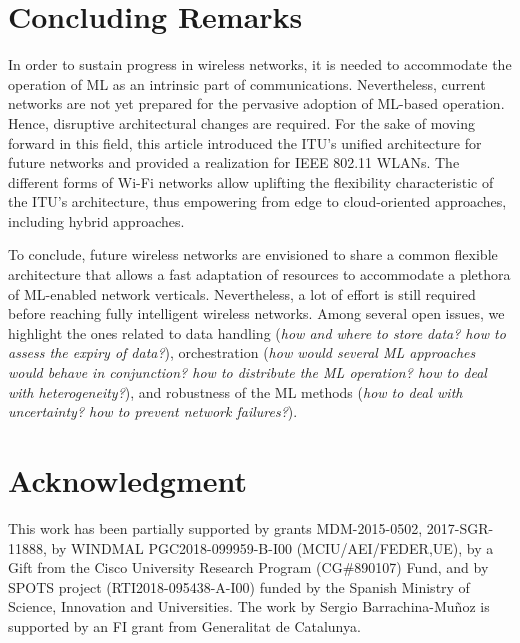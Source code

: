 \documentclass[journal]{IEEEtran}
\begin{document}


\section{Concluding Remarks}
In order to sustain progress in wireless networks, it is needed to accommodate the operation of ML as an intrinsic part of communications. Nevertheless, current networks are not yet prepared for the pervasive adoption of ML-based operation. Hence, disruptive architectural changes are required. For the sake of moving forward in this field, this article introduced the ITU's unified architecture for future networks and provided a realization for IEEE 802.11 WLANs. The different forms of Wi-Fi networks allow uplifting the flexibility characteristic of the ITU's architecture, thus empowering from edge to cloud-oriented approaches, including hybrid approaches.

To conclude, future wireless networks are envisioned to share a common flexible architecture that allows a fast adaptation of resources to accommodate a plethora of ML-enabled network verticals. Nevertheless, a lot of effort is still required before reaching fully intelligent wireless networks. Among several open issues, we highlight the ones related to data handling (\textit{how and where to store data? how to assess the expiry of data?}), orchestration (\textit{how would several ML approaches would behave in conjunction? how to distribute the ML operation? how to deal with heterogeneity?}), and robustness of the ML methods (\textit{how to deal with uncertainty? how to prevent network failures?}). 


\section*{Acknowledgment}

This work has been partially supported by grants MDM-2015-0502, 2017-SGR-11888, by WINDMAL PGC2018-099959-B-I00 (MCIU/AEI/FEDER,UE), by a Gift from the Cisco University Research Program (CG\#890107) Fund, and by SPOTS project (RTI2018-095438-A-I00) funded by the Spanish Ministry of Science, Innovation and Universities. The work by Sergio Barrachina-Mu\~noz is supported by an FI grant from Generalitat de Catalunya.
\end{document}
